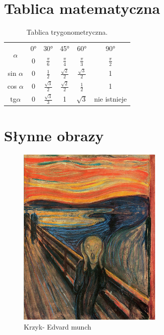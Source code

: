 \documentclass{article}
\begin{document}
\newpage
\section{Tablica matematyczna}

\begin{table}[h!]
  \begin{center}
    \caption{Tablica trygonometryczna.}
    \label{tab:table1}
	\Large
	\renewcommand{\arraystretch}{2}
    \begin{tabular}{|c|c|c|c|c|c|}
	\hline
	\multirow{2}{*}{$\alpha$} & 0° & 30° & 45° & 60° & 90° \\
  	&  0 &$\frac{\pi}{6}$ &$\frac{\pi}{4}$ & $\frac{\pi}{3}$ &$\frac{\pi}{2}$ \\
	\hline
	sin $\alpha$ & 0 & $\frac{1}{2}$ & $\frac{\sqrt{2}}{2}$ & $\frac{\sqrt{3}}{2}$ & 1 \\

	\hline
	cos $\alpha$ & 0 & $\frac{\sqrt{3}}{2}$ & $\frac{\sqrt{2}}{2}$ &  $\frac{1}{2}$ & 1 \\
	\hline
	tg$\alpha$  & 0 &   $\frac{\sqrt{3}}{3}$ & 1 & $\sqrt{3}$ & nie istnieje \\
	\hline
    \end{tabular}
	\renewcommand{\arraystretch}{1}
  \end{center}
\end{table}

\newpage 
\section{Słynne obrazy}

\begin{figure}[h!]
\centering
\includegraphics[width=7cm]{studentpodczassesji}
\caption{Krzyk- Edvard munch}
\label{fig:Krzyk}
\end{figure}
\end{document}
